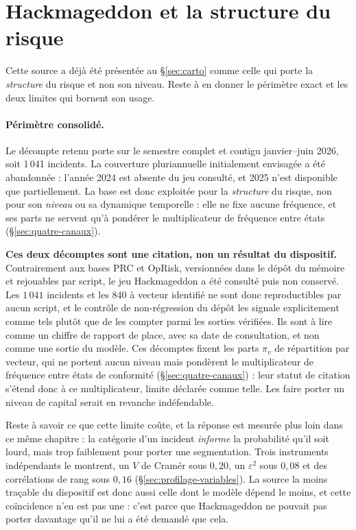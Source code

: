 
\section{Hackmageddon et la structure du risque}

Cette source a déjà été présentée au \S\ref{sec:carto} comme celle qui porte la
\emph{structure} du risque et non son niveau. Reste à en donner le périmètre exact et les
deux limites qui bornent son usage.

\paragraph{Périmètre consolidé.} Le décompte retenu porte sur le semestre complet et contigu
janvier--juin 2026, soit 1\,041 incidents. La couverture pluriannuelle initialement
envisagée a été abandonnée : l'année 2024 est absente du jeu consulté, et 2025 n'est
disponible que partiellement. La base est donc exploitée pour la \emph{structure} du risque,
non pour son \emph{niveau} ou sa dynamique temporelle : elle ne fixe aucune fréquence, et ses
parts ne servent qu'à pondérer le multiplicateur de fréquence entre états
(\S\ref{sec:quatre-canaux}).

\begin{attention}
\textbf{Ces deux décomptes sont une citation, non un résultat du dispositif.} Contrairement
aux bases PRC et OpRisk, versionnées dans le dépôt du mémoire et rejouables par script, le
jeu Hackmageddon a été consulté puis non conservé. Les $1\,041$ incidents et les
$840$ à vecteur identifié ne sont donc reproductibles par aucun script, et le contrôle de
non-régression du dépôt les signale explicitement comme tels plutôt que de les compter parmi
les sorties vérifiées. Ils sont à lire comme un chiffre de rapport de place, avec sa date de
consultation, et non comme une sortie du modèle. Ces décomptes fixent les parts $\pi_v$ de
répartition par vecteur, qui ne portent aucun niveau mais pondèrent le multiplicateur de
fréquence entre états de conformité (\S\ref{sec:quatre-canaux}) : leur statut de citation
s'étend donc à ce multiplicateur, limite déclarée comme telle. Les faire porter un niveau de
capital serait en revanche indéfendable.

\medskip
\noindent Reste à savoir ce que cette limite coûte, et la réponse est mesurée plus loin dans ce
même chapitre : la catégorie d'un incident \emph{informe} la probabilité qu'il soit lourd, mais
trop faiblement pour porter une segmentation. Trois instruments indépendants le montrent, un $V$
de Cramér sous $0{,}20$, un $\varepsilon^2$ sous $0{,}08$ et des corrélations de rang sous
$0{,}16$ (\S\ref{sec:profilage-variables}). La source la moins traçable du dispositif est donc aussi
celle dont le modèle dépend le moins, et cette coïncidence n'en est pas une : c'est parce que
Hackmageddon ne pouvait pas porter davantage qu'il ne lui a été demandé que cela.
\end{attention}

